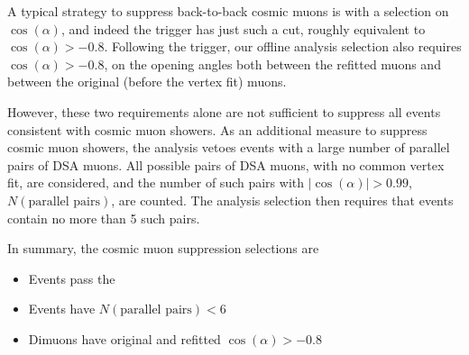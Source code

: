 A typical strategy to suppress back-to-back cosmic muons is with a selection on $\cos(\alpha)$, and indeed the trigger has just such a cut, roughly equivalent to $\cos(\alpha) > -0.8$.
Following the trigger, our offline analysis selection also requires $\cos(\alpha) > -0.8$, on the opening angles both between the refitted muons and between the original (before the vertex fit) muons.

However, these two requirements alone are not sufficient to suppress all events consistent with cosmic muon showers.
As an additional measure to suppress cosmic muon showers, the analysis vetoes events with a large number of parallel pairs of DSA muons.
All possible pairs of DSA muons, with no common vertex fit, are considered, and the number of such pairs with $|\cos(\alpha)| > 0.99$, $N(\text{parallel pairs})$, are counted.
The analysis selection then requires that events contain no more than 5 such pairs.

In summary, the cosmic muon suppression selections are
\begin{itemize}
  \item Events pass the 
  \item Events have $N(\text{parallel pairs}) < 6$
  \item Dimuons have original and refitted $\cos(\alpha) > -0.8$
\end{itemize}

